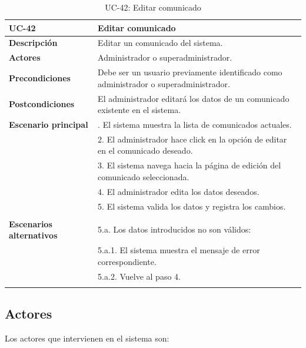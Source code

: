 \begin{table}
  \begin{center}
    \begin{tabularx}{16.4cm}{|l|X|}
      \hline
      \textbf{UC-42} & \textbf{Editar comunicado}\\
      \hline
      \textbf{Descripción} & Editar un comunicado del sistema.\\
      \hline
      \textbf{Actores} & Administrador o superadministrador.\\
      \hline
      \textbf{Precondiciones} & Debe ser un usuario previamente identificado como administrador o superadministrador.\\
      \hline
      \textbf{Postcondiciones} & El administrador editará los datos de un comunicado existente en el sistema.\\
      \hline
      \textbf{Escenario principal} & \smallskip 1. El sistema muestra la lista de comunicados actuales.\\
      & 2. El administrador hace click en la opción de editar en el comunicado deseado.\\
      & 3. El sistema navega hacia la página de edición del comunicado seleccionada.\\
      & 4. El administrador edita los datos deseados.\\
      & 5. El sistema valida los datos y registra los cambios.\\
      & \\
      \hline
      \textbf{Escenarios alternativos} & \smallskip 5.a. Los datos introducidos no son válidos:\\
      & \hspace{0.3cm} 5.a.1. El sistema muestra el mensaje de error correspondiente.\\
      & \hspace{0.3cm} 5.a.2. Vuelve al paso 4.\\
      & \\
      \hline
    \end{tabularx}
    \caption{UC-42: Editar comunicado}
    \label{tab:CU-editar-comunicado}
  \end{center}
\end{table}



\subsection{Actores} 

Los actores que intervienen en el sistema son: 

